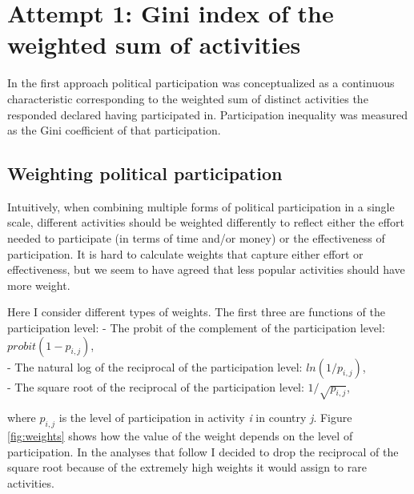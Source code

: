\documentclass[12pt,]{article}
\begin{document}
\hypertarget{attempt-1-gini-index-of-the-weighted-sum-of-activities}{%
\section{Attempt 1: Gini index of the weighted sum of activities}\label{attempt-1-gini-index-of-the-weighted-sum-of-activities}}

In the first approach political participation was conceptualized as a continuous characteristic corresponding to the weighted sum of distinct activities the responded declared having participated in. Participation inequality was measured as the Gini coefficient of that participation.

\hypertarget{weighting-political-participation}{%
\subsection{Weighting political participation}\label{weighting-political-participation}}

Intuitively, when combining multiple forms of political participation in a single scale, different activities should be weighted differently to reflect either the effort needed to participate (in terms of time and/or money) or the effectiveness of participation. It is hard to calculate weights that capture either effort or effectiveness, but we seem to have agreed that less popular activities should have more weight.

Here I consider different types of weights. The first three are functions of the participation level:
- The probit of the complement of the participation level: \(probit(1 - p_{i,j})\),\\
- The natural log of the reciprocal of the participation level: \(ln(1 / p_{i,j})\),\\
- The square root of the reciprocal of the participation level: \(1/\sqrt{p_{i,j}}\),

where \(p_{i,j}\) is the level of participation in activity \emph{i} in country \emph{j}. Figure \ref{fig:weights} shows how the value of the weight depends on the level of participation. In the analyses that follow I decided to drop the reciprocal of the square root because of the extremely high weights it would assign to rare activities.
\end{document}
